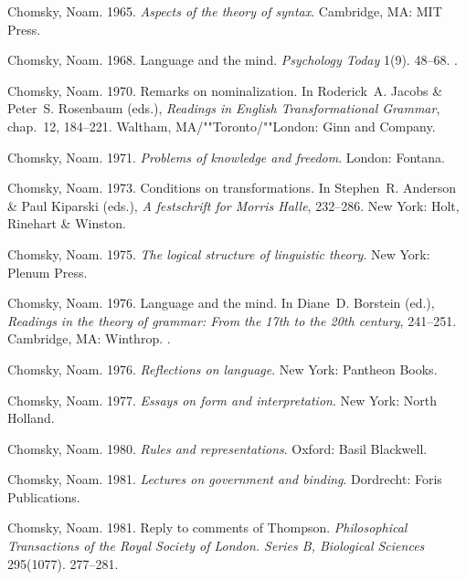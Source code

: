 \begin{thebibliography}{1420}
Chomsky, Noam. 1965.
\newblock \emph{Aspects of the theory of syntax}.
\newblock Cambridge, MA: MIT Press.

Chomsky, Noam. 1968.
\newblock Language and the mind.
\newblock \emph{Psychology Today} 1(9). 48--68.
\newblock \reprintas {}.

Chomsky, Noam. 1970.
\newblock Remarks on nominalization.
\newblock In Roderick~A. Jacobs \& Peter~S. Rosenbaum (eds.), \emph{Readings in
  {English} {Transformational Grammar}}, chap.~12, 184--221. Waltham,
  MA/""Toronto/""London: Ginn and Company.

Chomsky, Noam. 1971.
\newblock \emph{Problems of knowledge and freedom}.
\newblock London: Fontana.

Chomsky, Noam. 1973.
\newblock Conditions on transformations.
\newblock In Stephen~R. Anderson \& Paul Kiparski (eds.), \emph{A festschrift
  for {Morris Halle}}, 232--286. New York: Holt, Rinehart \& Winston.

Chomsky, Noam. 1975.
\newblock \emph{The logical structure of linguistic theory}.
\newblock New York: Plenum Press.

Chomsky, Noam. 1976{}.
\newblock Language and the mind.
\newblock In Diane~D. Borstein (ed.), \emph{Readings in the theory of grammar:
  From the 17th to the 20th century}, 241--251. Cambridge, MA: Winthrop.
\newblock \reprintfrom {}.

Chomsky, Noam. 1976{}.
\newblock \emph{Reflections on language}.
\newblock New York: Pantheon Books.

Chomsky, Noam. 1977.
\newblock \emph{Essays on form and interpretation}.
\newblock New York: North Holland.

Chomsky, Noam. 1980.
\newblock \emph{Rules and representations}.
\newblock Oxford: Basil Blackwell.

Chomsky, Noam. 1981{}.
\newblock \emph{Lectures on government and binding}.
\newblock Dordrecht: Foris Publications.

Chomsky, Noam. 1981{}.
\newblock Reply to comments of {Thompson}.
\newblock \emph{Philosophical Transactions of the Royal Society of London.
  Series B, Biological Sciences} 295(1077). 277--281.


\end{thebibliography}
